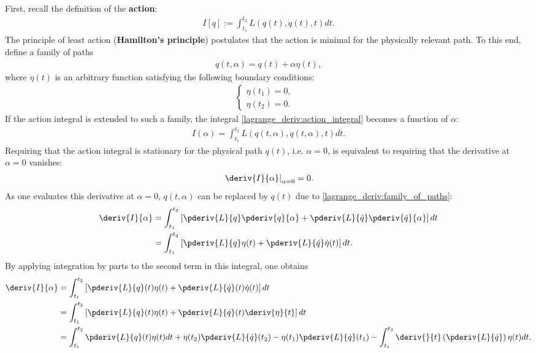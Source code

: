     First, recall the definition of the \textbf{action}:
    \begin{gather}
        \label{lagrange_deriv:action_integral}
        I[q] := \int_{t_1}^{t_2}L\left(q(t),\dot{q}(t),t\right)dt.
    \end{gather}
    The principle of least action (\textbf{Hamilton's principle}) postulates that the action is minimal for the physically relevant path. To this end, define a family of paths
    \begin{gather}
        \label{lagrange_deriv:family_of_paths}
        q(t,\alpha) = q(t) + \alpha\eta(t),
    \end{gather}
    where $\eta(t)$ is an arbitrary function satisfying the following boundary conditions:
    \begin{gather}
        \begin{cases}
        \eta(t_1) = 0,&\\
        \eta(t_2) = 0.&
        \end{cases}
    \end{gather}
    If the action integral is extended to such a family, the integral \eqref{lagrange_deriv:action_integral} becomes a function of $\alpha$:
    \begin{gather}
        \label{lagrange_deriv:action_integral_over_family}
        I(\alpha) = \int_{t_1}^{t_2}L\left(q(t,\alpha),\dot{q}(t,\alpha),t\right)dt.
    \end{gather}
    Requiring that the action integral is stationary for the physical path $q(t)$, i.e. $\alpha=0$, is equivalent to requiring that the derivative at $\alpha=0$ vanishes:
    \begin{gather}
        \label{lagrange_deriv:stationary_condition}
        \left.\deriv{I}{\alpha}\right|_{\alpha=0} = 0.
    \end{gather}
    As one evaluates this derivative at $\alpha=0$, $q(t,\alpha)$ can be replaced by $q(t)$ due to \eqref{lagrange_deriv:family_of_paths}:
    \begin{align}
        \deriv{I}{\alpha}&=\int_{t_1}^{t_2}\left[\pderiv{L}{q}\pderiv{q}{\alpha} + \pderiv{L}{\dot{q}}\pderiv{\dot{q}}{\alpha}\right]dt\nonumber\\
        &=\int_{t_1}^{t_2}\left[\pderiv{L}{q}\eta(t) + \pderiv{L}{\dot{q}}\dot{\eta}(t)\right]dt.
    \end{align}
    By applying integration by parts to the second term in this integral, one obtains
    \begin{align}
        \deriv{I}{\alpha}&=\int_{t_1}^{t_2}\left[\pderiv{L}{q}(t)\eta(t) + \pderiv{L}{\dot{q}}(t)\dot{\eta}(t)\right]dt\nonumber\\
        &=\int_{t_1}^{t_2}\left[\pderiv{L}{q}(t)\eta(t) + \pderiv{L}{\dot{q}}(t)\deriv{\eta}{t}\right]dt\nonumber\\
        &=\int_{t_1}^{t_2}\pderiv{L}{q}(t)\eta(t)dt + \eta(t_2)\pderiv{L}{\dot{q}}(t_2) - \eta(t_1)\pderiv{L}{\dot{q}}(t_1) - \int_{t_1}^{t_2}\deriv{}{t}\left(\pderiv{L}{\dot{q}}\right)\eta(t)dt.
    \end{align}
